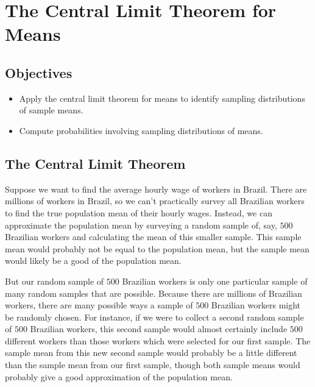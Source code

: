 \documentclass[letterpaper,10pt,english]{jupyterBook}
\begin{document}
\sphinxstepscope


\section{The Central Limit Theorem for Means}
\label{\detokenize{Ch4 The Normal Distribution and the Central Limit Theorem/4.4 The Central Limit Theorem for Means:the-central-limit-theorem-for-means}}\label{\detokenize{Ch4 The Normal Distribution and the Central Limit Theorem/4.4 The Central Limit Theorem for Means::doc}}

\subsection{Objectives}
\label{\detokenize{Ch4 The Normal Distribution and the Central Limit Theorem/4.4 The Central Limit Theorem for Means:objectives}}\begin{itemize}
\item {} 
\sphinxAtStartPar
Apply the central limit theorem for means to identify sampling distributions of sample means.

\item {} 
\sphinxAtStartPar
Compute probabilities involving sampling distributions of means.

\end{itemize}


\subsection{The Central Limit Theorem}
\label{\detokenize{Ch4 The Normal Distribution and the Central Limit Theorem/4.4 The Central Limit Theorem for Means:the-central-limit-theorem}}
\sphinxAtStartPar
Suppose we want to find the average hourly wage of workers in Brazil. There are millions of workers in Brazil, so we can’t practically survey all Brazilian workers to find the true population mean of their hourly wages. Instead, we can approximate the population mean by surveying a random sample of, say, \(500\) Brazilian workers and calculating the mean of this smaller sample. This sample mean would probably not be  equal to the population mean, but the sample mean would likely be a good  of the population mean.

\sphinxAtStartPar
But our random sample of \(500\) Brazilian workers is only one particular sample of many random samples that are possible. Because there are millions of Brazilian workers, there are many possible ways a sample of \(500\) Brazilian workers might be randomly chosen. For instance, if we were to collect a second random sample of \(500\) Brazilian workers, this second sample would almost certainly include \(500\) different workers than those workers which were selected for our first sample. The sample mean from this new second sample would probably be a little different than the sample mean from our first sample, though both sample means would probably give a good approximation of the population mean.
\end{document}
